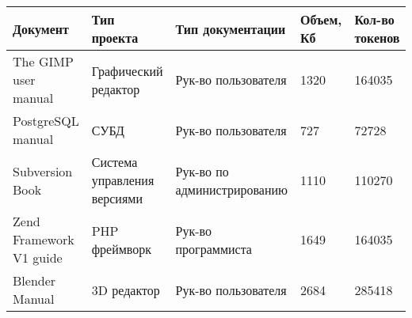 \begin{minipage}{0.9\textwidth}
\begin{adjustbox}{center}
\begin{tabular}{|m{}||m{}|m{}|m{}|m{}|}
	\hline
	Документ & Тип проекта & Тип документации & Объем, Кб & Кол-во токенов \\
	\hline
	\hline
	The GIMP user manual  & Графический редактор  & Рук-во пользователя  & 1320  & 164035 \\
	\hline
	PostgreSQL manual & СУБД & Рук-во пользователя & 727 & 72728 \\
	\hline
	Subversion Book & Система управления версиями & Рук-во по администрированию & 1110 &  110270 \\
	\hline
	Zend Framework V1 guide & PHP фреймворк & Рук-во программиста & 1649 & 164035 \\
	\hline
	Blender Manual & 3D редактор & Рук-во пользователя & 2684 & 285418 \\
	\hline
	
\end{tabular}
\end{adjustbox}
\end{minipage}